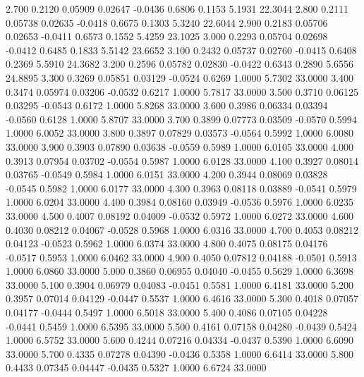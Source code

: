    2.700   0.2120   0.05909   0.02647  -0.0436   0.6806   0.1153   5.1931  22.3044
   2.800   0.2111   0.05738   0.02635  -0.0418   0.6675   0.1303   5.3240  22.6044
   2.900   0.2183   0.05706   0.02653  -0.0411   0.6573   0.1552   5.4259  23.1025
   3.000   0.2293   0.05704   0.02698  -0.0412   0.6485   0.1833   5.5142  23.6652
   3.100   0.2432   0.05737   0.02760  -0.0415   0.6408   0.2369   5.5910  24.3682
   3.200   0.2596   0.05782   0.02830  -0.0422   0.6343   0.2890   5.6556  24.8895
   3.300   0.3269   0.05851   0.03129  -0.0524   0.6269   1.0000   5.7302  33.0000
   3.400   0.3474   0.05974   0.03206  -0.0532   0.6217   1.0000   5.7817  33.0000
   3.500   0.3710   0.06125   0.03295  -0.0543   0.6172   1.0000   5.8268  33.0000
   3.600   0.3986   0.06334   0.03394  -0.0560   0.6128   1.0000   5.8707  33.0000
   3.700   0.3899   0.07773   0.03509  -0.0570   0.5994   1.0000   6.0052  33.0000
   3.800   0.3897   0.07829   0.03573  -0.0564   0.5992   1.0000   6.0080  33.0000
   3.900   0.3903   0.07890   0.03638  -0.0559   0.5989   1.0000   6.0105  33.0000
   4.000   0.3913   0.07954   0.03702  -0.0554   0.5987   1.0000   6.0128  33.0000
   4.100   0.3927   0.08014   0.03765  -0.0549   0.5984   1.0000   6.0151  33.0000
   4.200   0.3944   0.08069   0.03828  -0.0545   0.5982   1.0000   6.0177  33.0000
   4.300   0.3963   0.08118   0.03889  -0.0541   0.5979   1.0000   6.0204  33.0000
   4.400   0.3984   0.08160   0.03949  -0.0536   0.5976   1.0000   6.0235  33.0000
   4.500   0.4007   0.08192   0.04009  -0.0532   0.5972   1.0000   6.0272  33.0000
   4.600   0.4030   0.08212   0.04067  -0.0528   0.5968   1.0000   6.0316  33.0000
   4.700   0.4053   0.08212   0.04123  -0.0523   0.5962   1.0000   6.0374  33.0000
   4.800   0.4075   0.08175   0.04176  -0.0517   0.5953   1.0000   6.0462  33.0000
   4.900   0.4050   0.07812   0.04188  -0.0501   0.5913   1.0000   6.0860  33.0000
   5.000   0.3860   0.06955   0.04040  -0.0455   0.5629   1.0000   6.3698  33.0000
   5.100   0.3904   0.06979   0.04083  -0.0451   0.5581   1.0000   6.4181  33.0000
   5.200   0.3957   0.07014   0.04129  -0.0447   0.5537   1.0000   6.4616  33.0000
   5.300   0.4018   0.07057   0.04177  -0.0444   0.5497   1.0000   6.5018  33.0000
   5.400   0.4086   0.07105   0.04228  -0.0441   0.5459   1.0000   6.5395  33.0000
   5.500   0.4161   0.07158   0.04280  -0.0439   0.5424   1.0000   6.5752  33.0000
   5.600   0.4244   0.07216   0.04334  -0.0437   0.5390   1.0000   6.6090  33.0000
   5.700   0.4335   0.07278   0.04390  -0.0436   0.5358   1.0000   6.6414  33.0000
   5.800   0.4433   0.07345   0.04447  -0.0435   0.5327   1.0000   6.6724  33.0000
